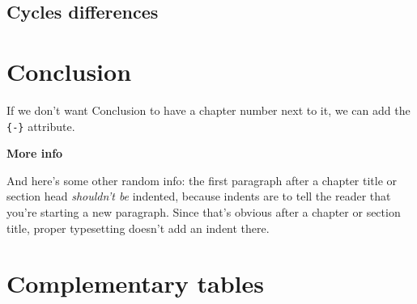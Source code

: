\documentclass[12pt,twoside]{reedthesis}
\begin{document}
\hypertarget{cycles-differences}{%
\section{Cycles differences}\label{cycles-differences}}

\hypertarget{conclusion}{%
\chapter*{Conclusion}\label{conclusion}}

If we don't want Conclusion to have a chapter number next to it, we can add the \texttt{\{-\}} attribute.

\textbf{More info}

And here's some other random info: the first paragraph after a chapter title or section head \emph{shouldn't be} indented, because indents are to tell the reader that you're starting a new paragraph. Since that's obvious after a chapter or section title, proper typesetting doesn't add an indent there.

\appendix

\hypertarget{complementary-tables}{%
\chapter{Complementary tables}\label{complementary-tables}}
\end{document}
